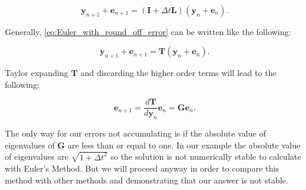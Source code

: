 \documentclass[11pt]{article}
\begin{document}
\begin{equation}\label{eq:Euler_with_round_off_error}
    {\mathbf{y}}_{n + 1} + {\mathbf{e}}_{n + 1} = 
    (\mathbf{I} + \Delta t\mathbf{L})({\mathbf{y}}_n + {\mathbf{e}}_{n}).
\end{equation}

Generally, \ref{eq:Euler_with_round_off_error} can be written like the
following:

\begin{equation}\label{eq:Euler_with_round_off_error_general}
    {\mathbf{y}}_{n + 1} + {\mathbf{e}}_{n + 1} = 
    \mathbf{T}({\mathbf{y}}_n + {\mathbf{e}}_{n}).
\end{equation}

Taylor expanding \(\mathbf{T}\) and discarding the higher order terms
will lead to the following:

\begin{equation}\label{eq:error_accumulation}
    {\mathbf{e}}_{n + 1} = \frac{d\mathbf{T}}
    {d\mathbf{y}_n}\mathbf{e}_n = \mathbf{G}\mathbf{e}_n.
\end{equation}

The only way for our errors not accumulating is if the absolute value of
eigenvalues of \(\mathbf{G}\) are less than or equal to one. In our
example the absolute value of eigenvalues are
\(\sqrt{1 + {\Delta t}^2}\) so the solution is not numerically stable to
calculate with Euler's Method. But we will proceed anyway in order to
compare this method with other methods and demonstrating that our answer
is not stable.
\end{document}
